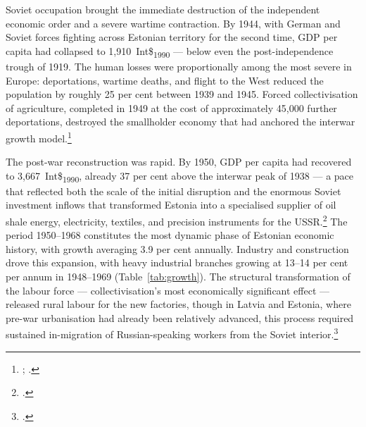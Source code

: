 \documentclass[12pt,a4paper]{article}
\newcommand{\intlnineteen}{Int\$\textsubscript{1990}}   %
\begin{document}
Soviet occupation brought the immediate destruction of the independent economic order and a severe wartime contraction. By 1944, with German and Soviet forces fighting across Estonian territory for the second time, GDP per capita had collapsed to 1,910~\intlnineteen{} — below even the post-independence trough of 1919. The human losses were proportionally among the most severe in Europe: deportations, wartime deaths, and flight to the West reduced the population by roughly 25 per cent between 1939 and 1945. Forced collectivisation of agriculture, completed in 1949 at the cost of approximately 45,000 further deportations, destroyed the smallholder economy that had anchored the interwar growth model.\footnote{\autocite[265]{taagepera_coll01}; \autocite[12]{deportations_ee}.}

The post-war reconstruction was rapid. By 1950, GDP per capita had recovered to 3,667~\intlnineteen{}, already 37 per cent above the interwar peak of 1938 — a pace that reflected both the scale of the initial disruption and the enormous Soviet investment inflows that transformed Estonia into a specialised supplier of oil shale energy, electricity, textiles, and precision instruments for the USSR.\footnote{\autocite[158--217]{case_estonia}.} The period 1950--1968 constitutes the most dynamic phase of Estonian economic history, with growth averaging 3.9 per cent annually. Industry and construction drove this expansion, with heavy industrial branches growing at 13--14 per cent per annum in 1948--1969 (Table~\ref{tab:growth}). The structural transformation of the labour force — collectivisation's most economically significant effect — released rural labour for the new factories, though in Latvia and Estonia, where pre-war urbanisation had already been relatively advanced, this process required sustained in-migration of Russian-speaking workers from the Soviet interior.\footnote{\autocite{case_estonia}.}
\end{document}
